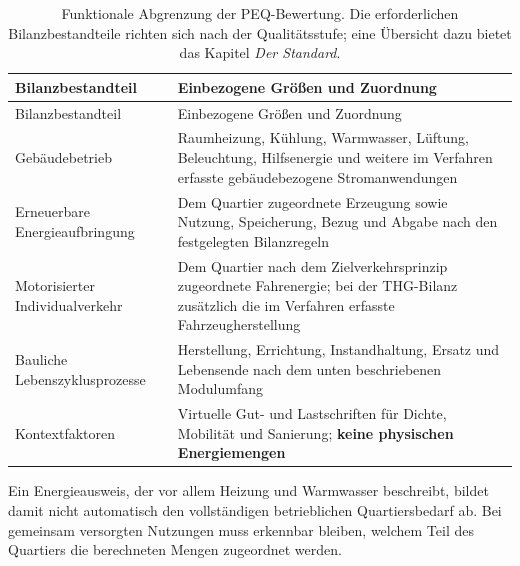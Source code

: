 \documentclass[
  ngerman,
  a4paper,
  DIV=11]{scrreprt}
\begin{document}
\begin{longtable}[]{@{}
  >{\raggedright\arraybackslash}p{}
  >{\raggedright\arraybackslash}p{}@{}}
\caption{Funktionale Abgrenzung der PEQ-Bewertung. Die erforderlichen
Bilanzbestandteile richten sich nach der Qualitätsstufe; eine Übersicht
dazu bietet das Kapitel \emph{Der
Standard}.}\label{tbl-bilanzumfang}\tabularnewline
\toprule\noalign{}
\begin{minipage}[b]{\linewidth}\raggedright
Bilanzbestandteil
\end{minipage} & \begin{minipage}[b]{\linewidth}\raggedright
Einbezogene Größen und Zuordnung
\end{minipage} \\
\midrule\noalign{}
\endfirsthead
\toprule\noalign{}
\begin{minipage}[b]{\linewidth}\raggedright
Bilanzbestandteil
\end{minipage} & \begin{minipage}[b]{\linewidth}\raggedright
Einbezogene Größen und Zuordnung
\end{minipage} \\
\midrule\noalign{}
\endhead
\bottomrule\noalign{}
\endlastfoot
Gebäudebetrieb & Raumheizung, Kühlung, Warmwasser, Lüftung, Beleuchtung,
Hilfsenergie und weitere im Verfahren erfasste gebäudebezogene
Stromanwendungen \\
Erneuerbare Energieaufbringung & Dem Quartier zugeordnete Erzeugung
sowie Nutzung, Speicherung, Bezug und Abgabe nach den festgelegten
Bilanzregeln \\
Motorisierter Individualverkehr & Dem Quartier nach dem
Zielverkehrsprinzip zugeordnete Fahrenergie; bei der THG-Bilanz
zusätzlich die im Verfahren erfasste Fahrzeugherstellung \\
Bauliche Lebenszyklusprozesse & Herstellung, Errichtung, Instandhaltung,
Ersatz und Lebensende nach dem unten beschriebenen Modulumfang \\
Kontextfaktoren & Virtuelle Gut- und Lastschriften für Dichte, Mobilität
und Sanierung; \textbf{keine physischen Energiemengen} \\
\end{longtable}

Ein Energieausweis, der vor allem Heizung und Warmwasser beschreibt,
bildet damit nicht automatisch den vollständigen betrieblichen
Quartiersbedarf ab. Bei gemeinsam versorgten Nutzungen muss erkennbar
bleiben, welchem Teil des Quartiers die berechneten Mengen zugeordnet
werden.
\end{document}
